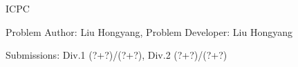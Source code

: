\begin{Solution}{ICPC}

\begin{frame}{\ProblemName}

\small Problem Author: Liu Hongyang, Problem Developer: Liu Hongyang \par \vspace{0.3cm}

\small Submissions: Div.1 (?+?)/(?+?), Div.2 (?+?)/(?+?)  \par \vspace{0.5cm}


\end{frame}

\end{Solution}
